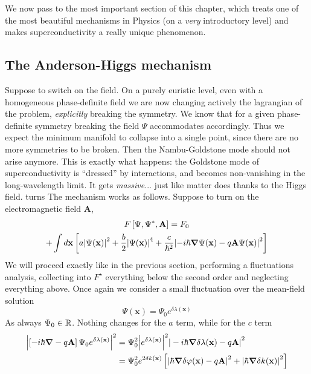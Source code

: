 We now pass to the most important section of this chapter, which treats one of the most beautiful mechanisms in Physics (on a \textit{very} introductory level) and makes superconductivity a really unique phenomenon.

\subsection{The Anderson-Higgs mechanism}

Suppose to switch on the field. On a purely euristic level, even with a homogeneous phase-definite field we are now changing actively the lagrangian of the problem, \textit{explicitly} breaking the symmetry. We know that for a given phase-definite symmetry breaking the field $\Psi$ accommodates accordingly. Thus we expect the minimum manifold to collapse into a single point, since there are no more symmetries to be broken. Then the Nambu-Goldstone mode should not arise anymore. This is exactly what happens: the Goldstone mode of superconductivity is ``dressed'' by interactions, and becomes non-vanishing in the long-wavelength limit. It gets \textit{massive}... just like matter does thanks to the Higgs field.
turns
The mechanism works as follows. Suppose to turn on the electromagnetic field $\mathbf{A}$,
\begin{multline*}
    F \left[{ \Psi,\Psi^*,\mathbf{A}}\right] = F_0 \\
    + \int d\mathbf{x} \left[{
        a \abs{\Psi(\mathbf{x)} }^2 + \frac{b}{2} \abs{ \Psi(\mathbf{x)} }^4 + \frac{c}{\hbar^2} \abs{-i\hbar\grad \Psi(\mathbf{x)} - q \mathbf{A} \Psi(\mathbf{x)} }^2
    }\right]
\end{multline*}
We will proceed exactly like in the previous section, performing a fluctuations analysis, collecting into $F^\star$ everything below the second order and neglecting everything above. Once again we consider a small fluctuation over the mean-field solution
\[
    \Psi(\mathbf{x}) = \Psi_0 e^{\delta \lambda (\mathbf{x})}
\]
As always $\Psi_0 \in \mathbb{R}$. Nothing changes for the $a$ term, while for the $c$ term
\[
\begin{aligned}
    \abs{ \left[{-i \hbar \grad - q \mathbf{A}}\right] \Psi_0 e^{\delta \lambda (\mathbf{x})}}^2 &= \Psi_0^2 \abs{e^{\delta \lambda (\mathbf{x})}}^2 \abs{ \vphantom{A'} -i\hbar \grad \delta \lambda(\mathbf{x}) - q \mathbf{A} }^2 \\
    &= \Psi_0^2 e^{2\delta k(\mathbf{x})} \left[{ \abs{\hbar \grad \delta \varphi (\mathbf{x}) - q \mathbf{A}}^2 + \abs{\hbar \grad \delta k(\mathbf{x})}^2 }\right]
\end{aligned}
\]
